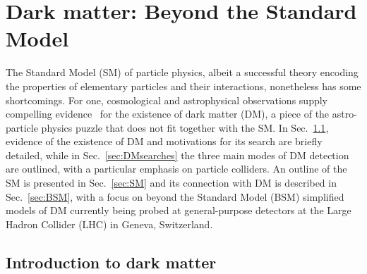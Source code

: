 \chapter{Dark matter: Beyond the Standard Model}
\label{chap:DM}

The Standard Model (SM) of particle physics, albeit a successful theory encoding the properties of elementary particles and their interactions, nonetheless has some shortcomings. For one, cosmological and astrophysical observations supply compelling evidence~\cite{Bertone:2004pz, Feng:2010gw, Porter:2011nv} for the existence of dark matter (DM), a piece of the astro-particle physics puzzle that does not fit together with the SM. In Sec.~\ref{sec:DMintro}, evidence of the existence of DM and motivations for its search are briefly detailed, while in Sec.~\ref{sec:DMsearches} the three main modes of DM detection are outlined, with a particular emphasis on particle colliders. An outline of the SM is presented in Sec.~\ref{sec:SM} and its connection with DM is described in Sec.~\ref{sec:BSM}, with a focus on beyond the Standard Model (BSM) simplified models of DM currently being probed at general-purpose detectors at the Large Hadron Collider (LHC) in Geneva, Switzerland.

\section{Introduction to dark matter}
\label{sec:DMintro}

